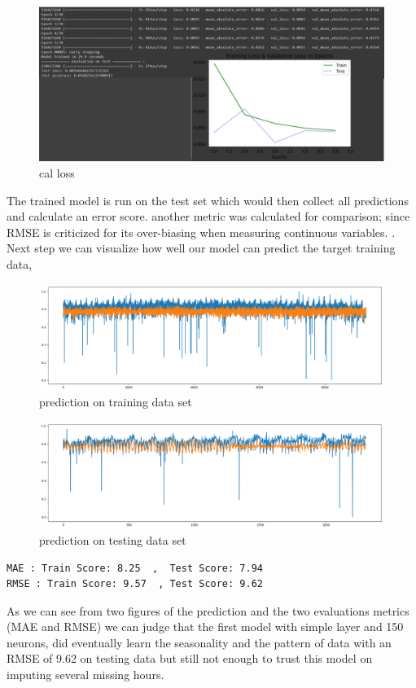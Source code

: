 %
\begin{figure}[h]
\centering
\includegraphics[scale=.4]{img/_verbose.PNG}  
\caption{cal loss}
\label{fig:verbose}
\end{figure}
%
The trained model is run on the test set which would then collect all predictions and calculate an error score. another metric was calculated for comparison; since RMSE is criticized for its over-biasing when measuring continuous variables.
\cite{Chai_Draxler_2014}.\\Next step we can visualize how well our model can predict the target training data, 
%
\begin{figure}[h]
\centering
\includegraphics[scale=.4]{img/prevision_sur_training.png}  
\caption{prediction on training data set}
\label{fig:verbose}
\end{figure}
%
%
\begin{figure}[h]
\centering
\includegraphics[scale=.4]{img/prevision_sur_test.png}  
\caption{prediction on testing  data set}
\label{fig:verbose}
\end{figure}
%
\newline
%
\begin{verbatim}
MAE : Train Score: 8.25  ,  Test Score: 7.94
RMSE : Train Score: 9.57  , Test Score: 9.62 
\end{verbatim}
%
As we can see from two figures of the prediction and the two  evaluations metrics (MAE and RMSE) we can judge that the first model with simple layer and 150 neurons, did eventually learn the seasonality and the pattern of data with an RMSE of 9.62 on testing data but still not enough to trust this model on imputing several missing hours. 

